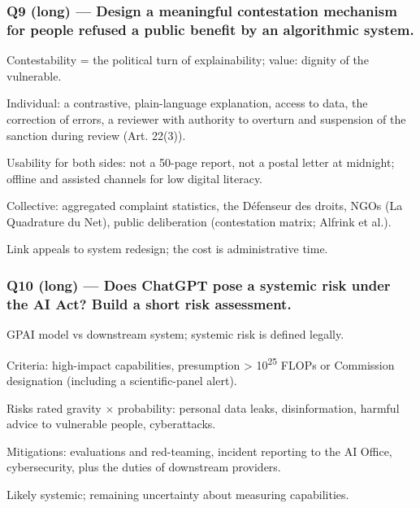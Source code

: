 \documentclass[11pt,a4paper]{article}
\newcommand{\blk}[1]{{\setlength{\fboxsep}{2pt}\colorbox{ink}{\sffamily\footnotesize\bfseries\color{white}\,#1\,}}}
\begin{document}
\subsubsection*{Q9 (long) — Design a meaningful contestation mechanism for people refused a public benefit by an algorithmic system.}
\begin{description}[leftmargin=1.2cm,style=sameline]
\item[\blk{F}] Contestability = the political turn of explainability; value: dignity of the vulnerable.
\item[\blk{A1}] Individual: a contrastive, plain-language explanation, access to data, the correction of errors, a reviewer with authority to overturn and suspension of the sanction during review (Art. 22(3)).
\item[\blk{A2}] Usability for both sides: not a 50-page report, not a postal letter at midnight; offline and assisted channels for low digital literacy.
\item[\blk{A3}] Collective: aggregated complaint statistics, the Défenseur des droits, NGOs (La Quadrature du Net), public deliberation (contestation matrix; Alfrink et al.).
\item[\blk{R}] Link appeals to system redesign; the cost is administrative time.
\end{description}
\subsubsection*{Q10 (long) — Does ChatGPT pose a systemic risk under the AI Act? Build a short risk assessment.}
\begin{description}[leftmargin=1.2cm,style=sameline]
\item[\blk{F}] GPAI model vs downstream system; systemic risk is defined legally.
\item[\blk{A1}] Criteria: high-impact capabilities, presumption > 10\textsuperscript{25} FLOPs or Commission designation (including a scientific-panel alert).
\item[\blk{A2}] Risks rated gravity $\times$ probability: personal data leaks, disinformation, harmful advice to vulnerable people, cyberattacks.
\item[\blk{A3}] Mitigations: evaluations and red-teaming, incident reporting to the AI Office, cybersecurity, plus the duties of downstream providers.
\item[\blk{R}] Likely systemic; remaining uncertainty about measuring capabilities.
\end{description}
\end{document}
